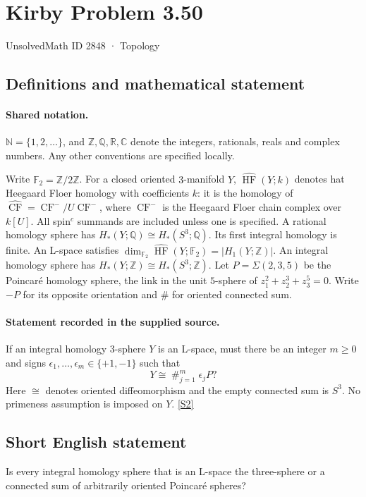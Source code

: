 \documentclass[11pt]{article}
\newcommand{\sref}[2]{\hyperlink{source:#1:#2}{[S#2]}}
\begin{document}
\setcounter{section}{2847}
\section{Kirby Problem 3.50}\label{2848}
{\small\sffamily UnsolvedMath ID 2848 · Topology}
\subsection{Definitions and mathematical statement}

\paragraph{Shared notation.}$\mathbb N=\{1,2,\ldots\}$, and $\mathbb Z,\mathbb Q,\mathbb R,\mathbb C$ denote the integers, rationals, reals and complex numbers. Any other conventions are specified locally.


Write $\mathbb F_2=\mathbb Z/2\mathbb Z$. For a closed oriented $3$-manifold $Y$, $\widehat{\operatorname{HF}}(Y;k)$ denotes hat Heegaard Floer homology with coefficients $k$: it is the homology of $\widehat{\operatorname{CF}}=\operatorname{CF}^-/U\operatorname{CF}^-$, where $\operatorname{CF}^-$ is the Heegaard Floer chain complex over $k[U]$. All spin$^c$ summands are included unless one is specified. A rational homology sphere has $H_*(Y;\mathbb Q)\cong H_*(S^3;\mathbb Q)$. Its first integral homology is finite. An L-space satisfies $\dim_{\mathbb F_2}\widehat{\operatorname{HF}}(Y;\mathbb F_2)=|H_1(Y;\mathbb Z)|$. An integral homology sphere has $H_*(Y;\mathbb Z)\cong H_*(S^3;\mathbb Z)$. Let $P=\Sigma(2,3,5)$ be the Poincar\'e homology sphere, the link in the unit $5$-sphere of $z_1^2+z_2^3+z_3^5=0$. Write $-P$ for its opposite orientation and $\#$ for oriented connected sum.
\paragraph{Statement recorded in the supplied source.}
If an integral homology $3$-sphere $Y$ is an L-space, must there be an integer $m\ge0$ and signs $\epsilon_1,\ldots,\epsilon_m\in\{+1,-1\}$ such that
\[
Y\cong\mathop{\#}_{j=1}^m\epsilon_jP?
\]
Here $\cong$ denotes oriented diffeomorphism and the empty connected sum is $S^3$. No primeness assumption is imposed on $Y$. \sref{2848}{2}
\subsection{Short English statement}
Is every integral homology sphere that is an L-space the three-sphere or a connected sum of arbitrarily oriented Poincaré spheres?
\end{document}
